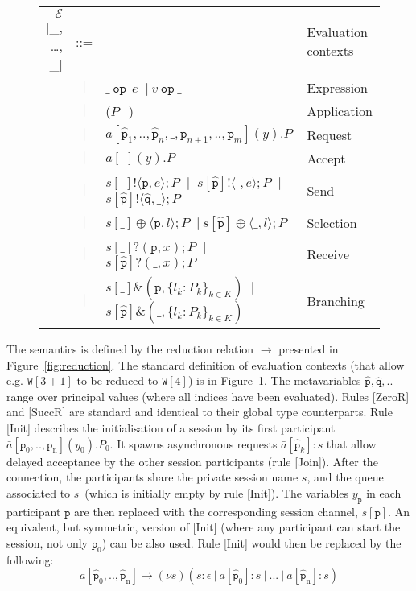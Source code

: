 \documentclass{LMCS}
\newcommand{\ptilde}[1]{{\ensuremath{#1}}}
\newcommand{\sr}[4]{\ensuremath{\bar{#1}[#2](#3).#4}}
\newcommand{\ssa}[4]{\ensuremath{#1[#2](#3).#4}}
\newcommand{\si}[2]{\ensuremath{#1[#2]}}
\newcommand{\sj}[3]{\ensuremath{\bar{#1}[#2]:#3}}
\newcommand{\outs}[4]{\ensuremath{#1!\langle #3,#2\rangle;#4}}
\newcommand{\inp}[4]{\ensuremath{#1?( #3,#2);#4}}
\newcommand{\x}{\ensuremath{x}}
\newcommand{\participant}[1]{\ensuremath{\mathtt{#1}}}
\newcommand{\q}{\ensuremath{\participant{q}}}
\newcommand{\p}{\ensuremath{\participant{p}}}
\newcommand{\pc}{\Par}
\newcommand{\s}{\ensuremath{s}}
\newcommand{\indexed}[4]{\ensuremath{\{#1_#3 : #2_#3\}_{#3 \in #4}}}
\newcommand{\anglep}[2]{\ensuremath{\langle #1, #2\rangle}}
\newcommand{\lsel}[4]{\ensuremath{#1 \oplus \anglep{#3}{#2};#4}}
\newcommand{\lbranchk}[2]{\ensuremath{#1 \&
({#2},\indexed{l}{\PP}{k}{K})}}
\newcommand{\at}[1]{\ensuremath{\ptilde{#1}}}
\newcommand{\Par}{\ensuremath{\ |\ }}
\newcommand{\redsym}{\ensuremath{\longrightarrow}}
\newcommand{\red}[2]{\ensuremath{#1\redsym#2}}
\newcommand{\sep}{\ensuremath{~\mathbf{|}~ }}
\newcommand{\qbot}{\ensuremath{\epsilon}}
\newcommand{\E}{\ensuremath{\mathcal{E}}}
\newcommand{\APP}{\;}
\newcommand{\y}{\ensuremath{y}}
\newcommand{\Ia}{\ensuremath{a}}
\newcommand{\n}{\ensuremath{\mathrm{n}}}
\newcommand{\pv}{\ensuremath{\at{\hat{\p}}}}
\newcommand{\qv}{\ensuremath{\at{\hat{\q}}}}
\newcommand{\PP}{\ensuremath{P}}
\newcommand{\W}{\ensuremath{\mathtt{W}}}
\newcommand{\op}{~\texttt{op}~}
\begin{document}
\begin{figure}[t]\centering
\begin{tabular}{r@{\ }c@{\ }l@{\quad}l}
  \E[\_, \ldots, \_] & ::= &  &\hspace{-2em} Evaluation contexts \\
   & \sep & $\_\op \ e$ \sep $v \op\_$ & Expression\\
   & \sep & (\PP\APP\_) & Application\\
& \sep & $\sr\Ia{\pv_1,..,\pv_n,\_, \p_{n+1},..,\p_m}{\y}{\PP} $ & Request \\
   & \sep & $\ssa\Ia{\_}{\y}{\PP}$ & Accept \\
   & \sep & $\outs{\si{\s}{\_}}{e}{\p}{\PP}$ 
            \sep
            $\outs{\si{\s}{\pv}}{e}{\_}{\PP}$ 
            \sep
            $\outs{\si{\s}{\pv}}{\_}{\qv}{\PP}$ 
            & Send\\
& \sep & $\lsel{\si{\s}{\_}}{l}{\p}{\PP} $ 
\sep $\lsel{\si{\s}{\pv}}{l}{\_}{\PP} $ 
& Selection\\
   & \sep & $\inp{\si{\s}{\_}}{\x}{\p}{\PP}$ 
\sep $\inp{\si{\s}{\pv}}{\x}{\_}{\PP} $
& Receive\\
& \sep & $\lbranchk{\si{\s}{\_}}{\p} $ 
     \sep   $\lbranchk{\si{\s}{\pv}}{\_} $ 
& Branching\\
\end{tabular}
\caption{}\label{fig:context}
\end{figure}

 
The semantics is defined by the reduction relation $\red{}{}$ presented in
Figure~\ref{fig:reduction}. The standard definition of evaluation contexts (that
allow 
e.g. $\W[3+1]$ to be reduced to $\W[4]$) is in Figure~\ref{fig:context}.
The metavariables $\pv,\qv,..$ range over principal values (where all indices
have been evaluated).
Rules [ZeroR] and [SuccR] are standard and
identical to their global type counterparts.  Rule [Init] describes the
initialisation of a session by its first participant
$\sr\Ia{\p_0,..,\p_\n}{\y_0}{\PP_0}$. It spawns asynchronous requests
$\sj{\Ia}{\pv_k}{\s}$ that allow delayed acceptance by the other session
participants (rule [Join]).  After the connection, the participants share the
private session name \s, and the queue associated to \s~(which is initially
empty by rule [Init]).  The variables $\y_\p$ in each participant $\p$ are then
replaced with the corresponding session channel, $\si{\s}{\p}$. An equivalent,
but symmetric, version of [Init] (where any participant can start the session, 
not only $\p_0$) can be also used. Rule [Init] would then be replaced by the
following:
$$
\bar{\Ia}[\pv_0,..,\pv_\n] \redsym (\nu \s)(
        s : \qbot \pc \sj{\Ia}{\pv_0}{\s} \pc ...\pc
        \sj{\Ia}{\pv_\n}{\s})
$$
\end{document}

